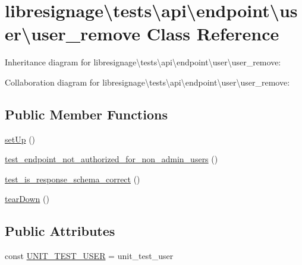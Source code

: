 \hypertarget{classlibresignage_1_1tests_1_1api_1_1endpoint_1_1user_1_1user__remove}{}\section{libresignage\textbackslash{}tests\textbackslash{}api\textbackslash{}endpoint\textbackslash{}user\textbackslash{}user\+\_\+remove Class Reference}
\label{classlibresignage_1_1tests_1_1api_1_1endpoint_1_1user_1_1user__remove}


Inheritance diagram for libresignage\textbackslash{}tests\textbackslash{}api\textbackslash{}endpoint\textbackslash{}user\textbackslash{}user\+\_\+remove\+:


Collaboration diagram for libresignage\textbackslash{}tests\textbackslash{}api\textbackslash{}endpoint\textbackslash{}user\textbackslash{}user\+\_\+remove\+:
\subsection*{Public Member Functions}
\begin{DoxyCompactItemize}
\item 
\hyperlink{classlibresignage_1_1tests_1_1api_1_1endpoint_1_1user_1_1user__remove_a793678d42690e4ec52007723aa5904a6}{set\+Up} ()
\item 
\hyperlink{classlibresignage_1_1tests_1_1api_1_1endpoint_1_1user_1_1user__remove_aa3f19e9fcec8f4eff8df8dbddb490ae3}{test\+\_\+endpoint\+\_\+not\+\_\+authorized\+\_\+for\+\_\+non\+\_\+admin\+\_\+users} ()
\item 
\hyperlink{classlibresignage_1_1tests_1_1api_1_1endpoint_1_1user_1_1user__remove_ac54247e89ab83d08a3d0bbf1b8149a00}{test\+\_\+is\+\_\+response\+\_\+schema\+\_\+correct} ()
\item 
\hyperlink{classlibresignage_1_1tests_1_1api_1_1endpoint_1_1user_1_1user__remove_a23efab0bab99ef46da5a36ed7321bf6f}{tear\+Down} ()
\end{DoxyCompactItemize}
\subsection*{Public Attributes}
\begin{DoxyCompactItemize}
\item 
const \hyperlink{classlibresignage_1_1tests_1_1api_1_1endpoint_1_1user_1_1user__remove_a545995a44336f0e2380759d75e7e7a84}{U\+N\+I\+T\+\_\+\+T\+E\+S\+T\+\_\+\+U\+S\+ER} = \textquotesingle{}unit\+\_\+test\+\_\+user\textquotesingle{}
\end{DoxyCompactItemize}
